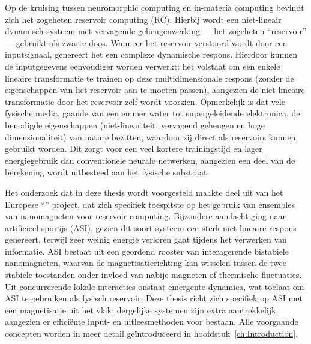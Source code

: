 Op de kruising tussen neuromorphic computing en in-materia computing bevindt zich het zogeheten reservoir computing (RC).
Hierbij wordt een niet-lineair dynamisch systeem met vervagende geheugenwerking --- het zogeheten ``reservoir'' --- gebruikt als zwarte doos.
Wanneer het reservoir verstoord wordt door een inputsignaal, genereert het een complexe dynamische respons.
Hierdoor kunnen de inputgegevens eenvoudiger worden verwerkt: het volstaat om een enkele lineaire transformatie te trainen op deze multidimensionale respons (zonder de eigenschappen van het reservoir aan te moeten passen), aangezien de niet-lineaire transformatie door het reservoir zelf wordt voorzien. 
Opmerkelijk is dat vele fysische media, gaande van een emmer water tot supergeleidende elektronica, de benodigde eigenschappen (niet-lineariteit, vervagend geheugen en hoge dimensionaliteit) van nature bezitten, waardoor zij direct als reservoirs kunnen gebruikt worden.
Dit zorgt voor een veel kortere trainingstijd en lager energiegebruik dan conventionele neurale netwerken, aangezien een deel van de berekening wordt uitbesteed aan het fysische substraat. \par
Het onderzoek dat in deze thesis wordt voorgesteld maakte deel uit van het Europese ``\spinengine'' project, dat zich specifiek toespitste op het gebruik van ensembles van nanomagneten voor reservoir computing.
Bijzondere aandacht ging naar artificieel spin-ijs (ASI), gezien dit soort systeem een sterk niet-lineaire respons genereert, terwijl zeer weinig energie verloren gaat tijdens het verwerken van informatie.
ASI bestaat uit een geordend rooster van interagerende bistabiele nanomagneten, waarvan de magnetisatierichting kan wisselen tussen de twee stabiele toestanden onder invloed van nabije magneten of thermische fluctuaties.
Uit concurrerende lokale interacties onstaat emergente dynamica, wat toelaat om ASI te gebruiken als fysisch reservoir.
Deze thesis richt zich specifiek op ASI met een magnetisatie uit het vlak: dergelijke systemen zijn extra aantrekkelijk aangezien er effici\"ente input- en uitleesmethoden voor bestaan.
Alle voorgaande concepten worden in meer detail ge\"introduceerd in hoofdstuk~\ref{ch:Introduction}. \\

